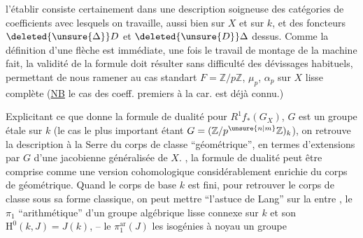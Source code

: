 l'établir consiste certainement dans une description soigneuse des catégories de coefficients avec lesquels on travaille, aussi bien sur $X$ et sur $k$, et des foncteurs $\deleted{\unsure{\Delta}}D$ et $\deleted{\unsure{D}}\Delta$ dessus. Comme la définition d'une flèche est immédiate, une fois le travail de montage de la machine fait, la validité de la formule doit résulter sans difficulté des dévissages habituels, permettant de nous ramener au cas standart $F=\mathbb{Z}/p\mathbb{Z}$, $\mu_p$, $\alpha_p$ sur $X$ lisse complète (\uline{NB} le cas des coeff. premiers à la car. est déjà connu.)

\noindent{}Explicitant ce que donne la formule de dualité pour $R^1f_*(G_X)$,  $G$ est un groupe  étale sur $k$ (le cas le plus important étant $G=(\mathbb{Z}/p^{\unsure{n|m}}\mathbb{Z})_k$), on retrouve la description à la Serre du corps de classe ``géométrique'', en termes d'extensions par $G$ d'une jacobienne généralisée de $X$. , la formule de dualité peut être comprise comme une version cohomologique considérablement enrichie du corps de  géométrique. Quand le corps de base $k$ est fini, pour retrouver le corps de classe sous sa forme classique, on peut mettre ``l'astuce de Lang'' sur la  entre , le $\pi_1$ ``arithmétique'' d'un groupe algébrique  lisse connexe  sur $k$ et son $\mathrm{H}^{0}(k,J)=J(k)$, -- le $\pi_1^{\mathrm{ar}}(J)$  les isogénies  à noyau un groupe 
